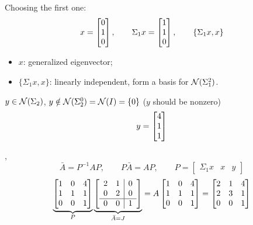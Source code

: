 \begin{example}
Choosing the first one:
\[
x=\begin{bmatrix}0\\1\\0\end{bmatrix},\qquad \Sigma_1x=\begin{bmatrix}1\\1\\0\end{bmatrix},\qquad \{\Sigma_1 x, x\}
\]
\begin{itemize}[noitemsep]
\item $x$: generalized eigenvector; \quad {}
\item $\{\Sigma_1x,x\}$: linearly independent, form a basis for $\mathcal{N}(\Sigma_1^2)$.
\end{itemize}

\begin{minipage}[c]{0.2\textwidth}
\centering
{}
\end{minipage}\hfill
\begin{minipage}[c]{0.76\textwidth}
$y\in\mathcal{N}(\Sigma_2)$, \quad $y\notin\mathcal{N}(\Sigma_2^0)=\mathcal{N}(I)=\{0\}$ \quad ($y$ should be nonzero)
\[
y=\begin{bmatrix}4\\1\\1\end{bmatrix}
\]
\end{minipage}

\sep
\[
\bar A=P^{-1}AP,\qquad P\bar A=AP,\qquad P=\left[\begin{array}{cc|c}\Sigma_1x & x & y\end{array}\right]
\]
\[
\underbrace{\begin{bmatrix}1&0&4\\1&1&1\\0&0&1\end{bmatrix}}_{P}
\underbrace{\left[\begin{array}{cc|c}2&1&0\\0&2&0\\\hline 0&0&1\end{array}\right]}_{\bar A=J}
=A\begin{bmatrix}1&0&4\\1&1&1\\0&0&1\end{bmatrix}=\begin{bmatrix}2&1&4\\2&3&1\\0&0&1\end{bmatrix}
\]


\end{example}
